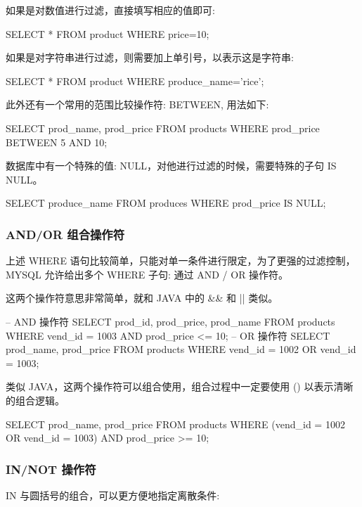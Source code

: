 如果是对数值进行过滤，直接填写相应的值即可:
\begin{sql}
SELECT * FROM product WHERE price=10;
\end{sql}

如果是对字符串进行过滤，则需要加上单引号，以表示这是字符串:
\begin{sql}
SELECT * FROM product WHERE produce_name='rice';
\end{sql}

此外还有一个常用的范围比较操作符: BETWEEN, 用法如下:
\begin{sql}
SELECT prod_name, prod_price
    FROM products
    WHERE prod_price BETWEEN 5 AND 10;
\end{sql}

数据库中有一个特殊的值: NULL，对他进行过滤的时候，需要特殊的子句 IS NULL。

\begin{sql}
SELECT produce_name FROM produces WHERE prod_price IS NULL;
\end{sql}

\subsubsection{AND/OR 组合操作符}

上述 WHERE 语句比较简单，只能对单一条件进行限定，为了更强的过滤控制，MYSQL 允许给出多个 WHERE 子句: 通过 AND / OR 操作符。

这两个操作符意思非常简单，就和 JAVA 中的 \&\& 和 || 类似。

\begin{sql}
-- AND 操作符
SELECT prod_id, prod_price, prod_name
    FROM products
    WHERE vend_id = 1003 AND prod_price <= 10;
-- OR 操作符
SELECT prod_name, prod_price
    FROM products
    WHERE vend_id = 1002 OR vend_id = 1003;
\end{sql}

类似 JAVA，这两个操作符可以组合使用，组合过程中一定要使用 () 以表示清晰的组合逻辑。

\begin{sql}
SELECT prod_name, prod_price
    FROM products
    WHERE (vend_id = 1002 OR vend_id = 1003) AND prod_price >= 10;
\end{sql}

\subsubsection{IN/NOT 操作符}

IN 与圆括号的组合，可以更方便地指定离散条件:

